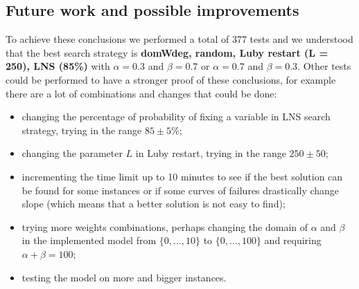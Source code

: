\documentclass[../main.tex]{subfiles}
\begin{document}
\subsection{Future work and possible improvements}
\label{subsec:future-work-possible-improvements}
To achieve these conclusions we performed a total of 377 tests and we understood that the best search strategy is \textbf{domWdeg, random, Luby restart (L = 250), LNS (85\%)} with $\alpha = 0.3$ and $\beta = 0.7$ or $\alpha = 0.7$ and $\beta = 0.3$. Other tests could be performed to have a stronger proof of these conclusions, for example there are a lot of combinations and changes that could be done:
\begin{itemize}
    \item changing the percentage of probability of fixing a variable in LNS search strategy, trying in the range $85 \pm 5$\%;
    \item changing the parameter $L$ in Luby restart, trying in the range $250 \pm 50$; 
    \item incrementing the time limit up to 10 minutes to see if the best solution can be found for some instances or if some curves of failures drastically change slope (which means that a better solution is not easy to find);
    \item trying more weights combinations, perhaps changing the domain of $\alpha$ and $\beta$ in the implemented model from $\{0, \dots, 10\}$ to $\{0, \dots, 100\}$ and requiring $\alpha + \beta = 100$;
    \item testing the model on more and bigger instances. 
\end{itemize}
\end{document}
